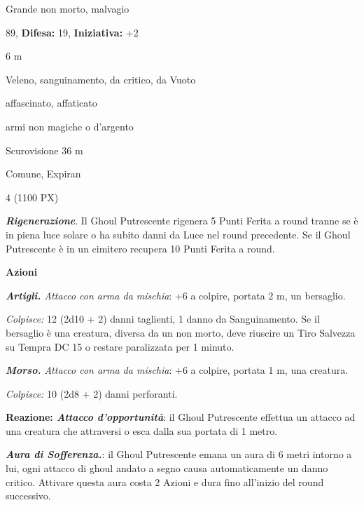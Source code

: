 \begin{multicols}{2}
{
\noindent
\begin{description}[noitemsep, topsep=0pt, parsep=0pt, partopsep=0pt, leftmargin=0cm, labelwidth=2.2cm]
	\item[\textbf{Taglia/Tipo:}] Grande non morto, malvagio
	\item[\textbf{Caratt.:}] 
	\item[\textbf{Punti Ferita:}] 89,  \textbf{Difesa:} 19,  \textbf{Iniziativa:} +2
	\item[\textbf{Movimento:}] 6 m
	\item[\textbf{Tiri Salvez.:}] 
	\item[\textbf{Imm. Danni:}] Veleno, sanguinamento, da critico, da Vuoto
	\item[\textbf{Immunità:}] affascinato, affaticato
	\item[\textbf{Res. Danni:}] armi non magiche o d'argento
	\item[\textbf{Sensi:}] Scurovisione 36 m
	\item[\textbf{Linguaggi:}] Comune, Expiran
	\item[\textbf{Sfida:}] 4 (1100 PX)\smallskip
\end{description}

\textbf{\emph{Rigenerazione}}. Il Ghoul Putrescente rigenera 5 Punti Ferita a round tranne se è in piena luce solare o ha subito danni da Luce nel round precedente. Se il Ghoul Putrescente è in un cimitero recupera 10 Punti Ferita a round.

\textbf{Azioni}

\emph{\textbf{Artigli.} Attacco con arma da mischia}: +6 a colpire, portata 2 m, un bersaglio.

\emph{Colpisce:} 12 (2d10 + 2) danni taglienti, 1 danno da Sanguinamento. Se il bersaglio è una creatura, diversa da un non morto, deve riuscire un Tiro Salvezza su Tempra DC 15 o restare paralizzata per 1 minuto.

\emph{\textbf{Morso.} Attacco con arma da mischia}: +6 a colpire, portata 1 m, una creatura.

\emph{Colpisce:} 10 (2d8 + 2) danni perforanti.

\textbf{Reazione: \emph{Attacco d'opportunità}}: il Ghoul Putrescente effettua un attacco ad una creatura che attraversi o esca dalla sua portata di 1 metro.

\emph{\textbf{Aura di Sofferenza.}}: il Ghoul Putrescente emana un aura di 6 metri intorno a lui, ogni attacco di ghoul andato a segno causa automaticamente un danno critico. Attivare questa aura costa 2 Azioni e dura fino all'inizio del round successivo.

}
\end{multicols}
